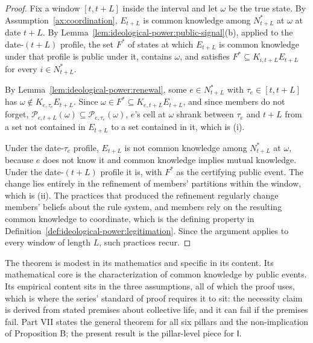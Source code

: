 \documentclass[11pt,letterpaper]{article}
\theoremstyle{definition}
\theoremstyle{remark}
\newcommand{\pI}{\mathsf{I}}
\begin{document}
\begin{proof}
Fix a window $[t,t+L]$ inside the interval and let $\omega$ be the true state. By Assumption~\ref{ax:coordination}, $E_{t+L}$ is common knowledge among $N^\ast_{t+L}$ at $\omega$ at date $t+L$. By Lemma~\ref{lem:ideological-power:public-signal}(b), applied to the date-$(t+L)$ profile, the set $F^\ast$ of states at which $E_{t+L}$ is common knowledge under that profile is public under it, contains $\omega$, and satisfies $F^\ast\subseteq K_{i,t+L}E_{t+L}$ for every $i\in N^\ast_{t+L}$.

By Lemma~\ref{lem:ideological-power:renewal}, some $e\in N^\ast_{t+L}$ with $\tau_e\in[t,t+L]$ has $\omega\notin K_{e,\tau_e}E_{t+L}$. Since $\omega\in F^\ast\subseteq K_{e,t+L}E_{t+L}$, and since members do not forget, $\mathcal{P}_{e,t+L}(\omega)\subseteq\mathcal{P}_{e,\tau_e}(\omega)$, $e$'s cell at $\omega$ shrank between $\tau_e$ and $t+L$ from a set not contained in $E_{t+L}$ to a set contained in it, which is (i).

Under the date-$\tau_e$ profile, $E_{t+L}$ is not common knowledge among $N^\ast_{t+L}$ at $\omega$, because $e$ does not know it and common knowledge implies mutual knowledge. Under the date-$(t+L)$ profile it is, with $F^\ast$ as the certifying public event. The change lies entirely in the refinement of members' partitions within the window, which is (ii). The practices that produced the refinement regularly change members' beliefs about the rule system, and members rely on the resulting common knowledge to coordinate, which is the defining property in Definition~\ref{def:ideological-power:legitimation}. Since the argument applies to every window of length $L$, such practices recur.
\end{proof}

The theorem is modest in its mathematics and specific in its content. Its mathematical core is the characterization of common knowledge by public events. Its empirical content sits in the three assumptions, all of which the proof uses, which is where the series' standard of proof requires it to sit: the necessity claim is derived from stated premises about collective life, and it can fail if the premises fail. Part VII states the general theorem for all six pillars and the non-implication of Proposition B; the present result is the pillar-level piece for $\pI$.
\end{document}
